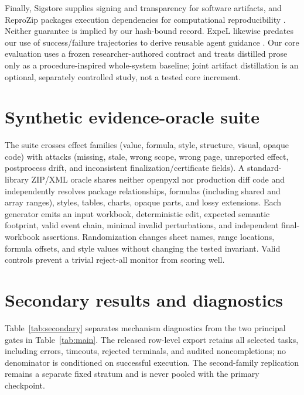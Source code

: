 Finally, Sigstore supplies signing and transparency for software artifacts, and
ReproZip packages execution dependencies for computational reproducibility
\citep{newman2022sigstore,chirigati2016reprozip}. Neither guarantee is implied by
our hash-bound record. ExpeL likewise predates our use of success/failure
trajectories to derive reusable agent guidance \citep{zhao2024expel}. Our core
evaluation uses a frozen researcher-authored contract and treats distilled
prose only as a procedure-inspired whole-system baseline; joint artifact
distillation is an optional, separately controlled study, not a tested core
increment.

\section{Synthetic evidence-oracle suite}
\label{app:oracle}

The suite crosses effect families (value, formula, style, structure, visual,
opaque code) with attacks (missing, stale, wrong scope, wrong page, unreported
effect, postprocess drift, and inconsistent finalization/certificate fields). A standard-
library ZIP/XML oracle shares neither openpyxl nor production diff code and
independently resolves package relationships, formulas (including shared and
array ranges), styles, tables, charts, opaque parts, and lossy extensions. Each
generator emits an input workbook, deterministic edit, expected semantic
footprint, valid event chain, minimal invalid perturbations, and independent
final-workbook assertions.
Randomization changes sheet names, range locations, formula offsets, and style
values without changing the tested invariant. Valid controls prevent a trivial
reject-all monitor from scoring well.

\section{Secondary results and diagnostics}
\label{app:secondary-results}



Table~\ref{tab:secondary} separates mechanism diagnostics from the two
principal gates in Table~\ref{tab:main}. The released row-level export retains
all selected tasks, including errors, timeouts, rejected terminals, and audited
noncompletions; no denominator is conditioned on successful execution. The
second-family replication remains a separate fixed stratum and is never pooled
with the primary checkpoint.

